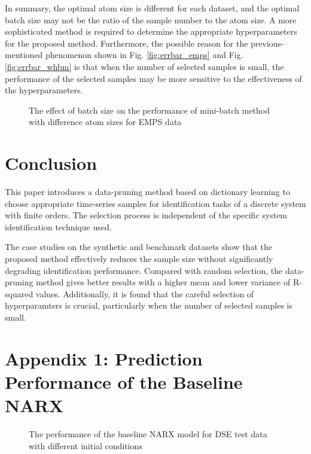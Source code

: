 \documentclass{article}
\begin{document}
In summary, the optimal atom size is different for each dataset, and the optimal batch size may not be the ratio of the sample number to the atom size.
A more sophisticated method is required to determine the appropriate hyperparameters for the proposed method. 
Furthermore, the possible reason for the previous-mentioned phenomenon shown in Fig. \ref{fig:errbar_emps} and Fig. \ref{fig:errbar_whbm} is that when the number of selected samples is small, the performance of the selected samples may be more sensitive to the effectiveness of the hyperparameters.


\begin{figure} [htbp!]
\centering
    \caption{The effect of batch size on the performance of mini-batch method with difference atom sizes for EMPS data}\label{fig:batch_emps_diffatom}
\end{figure}

\section{Conclusion}
This paper introduces a data-pruning method based on dictionary learning to choose appropriate time-series samples for identification tasks of a discrete system with finite orders. 
The selection process is independent of the specific system identification technique used. 

The case studies on the synthetic and benchmark datasets show that the proposed method effectively reduces the sample size without significantly degrading identification performance. 
Compared with random selection, the data-pruning method gives better results with a higher mean and lower variance of R-squared values.
Additionally, it is found that the careful selection of hyperparamters is crucial, particularly when the number of selected samples is small. 

\section*{Appendix 1: Prediction Performance of the Baseline NARX}\label{appx1}
\begin{figure} [htbp]
\centering
    \vspace{0.2cm}
    \caption{The performance of the baseline NARX model for DSE test data with different initial conditions}\label{fig:pre_dsed}
\end{figure}
\end{document}
